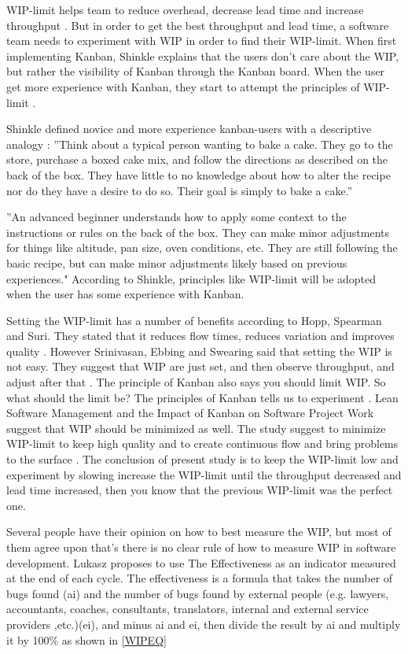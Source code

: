 \documentclass[UKenglish]{ifimaster}  %
\begin{document}
WIP-limit helps team to reduce overhead, decrease lead time and increase throughput \parencite {CONWIP}. But in order to get the best throughput and lead time, a software team needs to experiment with WIP in order to find their WIP-limit. When first implementing Kanban, Shinkle explains that the users don't care about the WIP, but rather the visibility of Kanban through the Kanban board. When the user get more experience with Kanban, they start to attempt the principles of WIP-limit \parencite{Shinkle}.

Shinkle defined novice and more experience kanban-users with a descriptive analogy \parencite{Shinkle}:
''Think about a typical person wanting to bake a cake. They go to the store, purchase a boxed cake mix, and follow the directions as described on the back of the box. They have little to no knowledge about how to alter the recipe nor do they have a desire to do so. Their goal is simply to bake a cake.''

''An advanced beginner understands how to apply some context to the instructions or rules on the back of the box. They can make minor adjustments for things like altitude, pan size, oven conditions, etc. They are still following the basic recipe, but can make minor adjustments likely based on previous experiences." According to Shinkle, principles like WIP-limit will be adopted when the user has some experience with Kanban. 

Setting the WIP-limit has a number of benefits according to Hopp, Spearman and Suri. They stated that it reduces flow times, reduces variation and improves quality \parencite{CONWIP}. However Srinivasan, Ebbing and Swearing said that setting the WIP is not easy. They suggest that WIP are just set, and then observe throughput, and adjust after that \parencite{Mandyam}. The principle of Kanban also says you should limit WIP. So what should the limit be? The principles of Kanban tells us to experiment \parencite{Kniberg}. Lean Software Management and the Impact of Kanban on Software Project Work suggest that WIP should be minimized as well. The study suggest to minimize WIP-limit to keep high quality \parencite{Ikonen} and to create continuous flow and bring problems to the surface \parencite{Joyce}. The conclusion of present study is to keep the WIP-limit low and experiment by slowing increase the WIP-limit until the throughput decreased and lead time increased, then you know that the previous WIP-limit was the perfect one.

Several people have their opinion on how to best measure the WIP, but most of them agree upon that's there is no clear rule of how to measure WIP in software development. Lukasz proposes to use The Effectiveness as an indicator measured at the end of each cycle. The effectiveness is a formula that takes the number of bugs found (ai) and the number of bugs found by external people (e.g. lawyers, accountants, coaches, consultants, translators, internal and external service providers ,etc.)(ei), and minus ai and ei, then divide the result by ai and multiply it by 100\%  as shown in \ref{WIPEQ} \parencite{Sienkiewicz}
\end{document}
